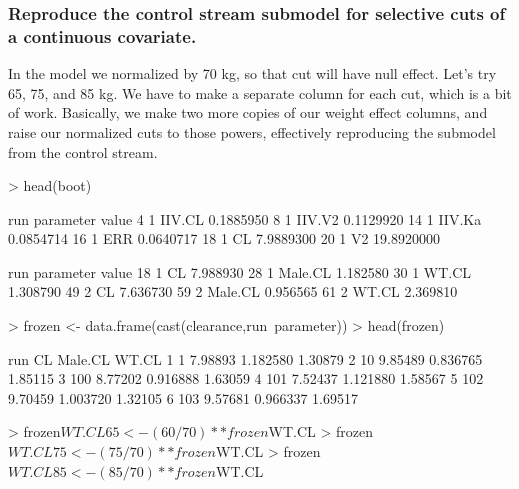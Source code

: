 \subsubsection{Reproduce the control stream submodel for selective cuts of a continuous covariate.}
In the model we normalized by 70 kg, so that cut will have null effect.
Let's try 65, 75, and 85 kg. We have to make a separate column for each
cut, which is a bit of work. Basically, we make two more copies of our
weight effect columns, and raise our normalized cuts to those powers, 
effectively reproducing the submodel from the control stream.
\begin{Schunk}
\begin{Sinput}
> head(boot) 
\end{Sinput}
\begin{Soutput}
   run parameter      value
4    1    IIV.CL  0.1885950
8    1    IIV.V2  0.1129920
14   1    IIV.Ka  0.0854714
16   1       ERR  0.0640717
18   1        CL  7.9889300
20   1        V2 19.8920000
\end{Soutput}
\begin{Soutput}
   run parameter    value
18   1        CL 7.988930
28   1   Male.CL 1.182580
30   1     WT.CL 1.308790
49   2        CL 7.636730
59   2   Male.CL 0.956565
61   2     WT.CL 2.369810
\end{Soutput}
\begin{Sinput}
> frozen <- data.frame(cast(clearance,run~parameter))
> head(frozen)
\end{Sinput}
\begin{Soutput}
  run      CL  Male.CL   WT.CL
1   1 7.98893 1.182580 1.30879
2  10 9.85489 0.836765 1.85115
3 100 8.77202 0.916888 1.63059
4 101 7.52437 1.121880 1.58567
5 102 9.70459 1.003720 1.32105
6 103 9.57681 0.966337 1.69517
\end{Soutput}
\begin{Sinput}
> frozen$WT.CL65 <- (60/70)**frozen$WT.CL
> frozen$WT.CL75 <- (75/70)**frozen$WT.CL
> frozen$WT.CL85 <- (85/70)**frozen$WT.CL
\end{Sinput}
\end{Schunk}
